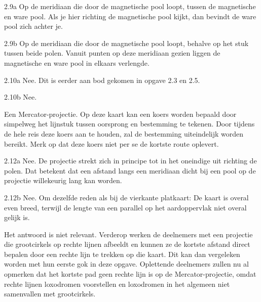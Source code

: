 \begin{Antwoord}{2.9a}
			Op de meridiaan die door de magnetische pool loopt, tussen de magnetische en ware pool. Als je hier richting de magnetische pool kijkt, dan bevindt de ware pool zich achter je.
		
\end{Antwoord}
\begin{Antwoord}{2.9b}
			Op de meridiaan die door de magnetische pool loopt, behalve op het stuk tussen beide polen. Vanuit punten op deze meridiaan gezien liggen de magnetische en ware pool in elkaars verlengde.
		
\end{Antwoord}
\begin{Antwoord}{2.10a}
			Nee. Dit is eerder aan bod gekomen in opgave 2.3 en 2.5.
		
\end{Antwoord}
\begin{Antwoord}{2.10b}
			Nee.
		
\end{Antwoord}
\begin{Antwoord}{2.11}
		Een Mercator-projectie. Op deze kaart kan een koers worden bepaald door simpelweg het lijnstuk tussen oorsprong en bestemming te tekenen. Door tijdens de hele reis deze koers aan te houden, zal de bestemming uiteindelijk worden bereikt. Merk op dat deze koers niet per se de kortste route oplevert.
	
\end{Antwoord}
\begin{Antwoord}{2.12a}
			Nee. De projectie strekt zich in principe tot in het oneindige uit richting de polen. Dat betekent dat een afstand langs een meridiaan dicht bij een pool op de projectie willekeurig lang kan worden.
		
\end{Antwoord}
\begin{Antwoord}{2.12b}
			Nee. Om dezelfde reden als bij de vierkante platkaart: De kaart is overal even breed, terwijl de lengte van een parallel op het aardoppervlak niet overal gelijk is.
		
\end{Antwoord}
\begin{Antwoord}{2.13}
		Het antwoord is niet relevant. Verderop werken de deelnemers met een projectie die grootcirkels op rechte lijnen afbeeldt en kunnen ze de kortste afstand direct bepalen door een rechte lijn te trekken op die kaart. Dit kan dan vergeleken worden met hun eerste gok in deze opgave. Oplettende deelnemers zullen nu al opmerken dat het kortste pad geen rechte lijn is op de Mercator-projectie, omdat rechte lijnen loxodromen voorstellen en loxodromen in het algemeen niet samenvallen met grootcirkels.
	
\end{Antwoord}
